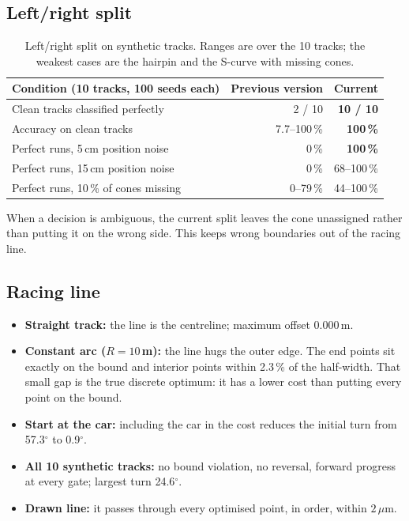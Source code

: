 \documentclass[10pt,a4paper]{scrartcl}
\begin{document}
  \subsection{Left/right split}

  \begin{table}[htbp]
  \small
  \centering
  \begin{tabular}{@{}lrr@{}}
  \toprule
  \textbf{Condition (10 tracks, 100 seeds each)} & \textbf{Previous version} & \textbf{Current} \\
  \midrule
  Clean tracks classified perfectly & 2 / 10 & \textbf{10 / 10} \\
  Accuracy on clean tracks & 7.7--100\,\% & \textbf{100\,\%} \\
  Perfect runs, 5\,cm position noise & 0\,\% & \textbf{100\,\%} \\
  Perfect runs, 15\,cm position noise & 0\,\% & 68--100\,\% \\
  Perfect runs, 10\,\% of cones missing & 0--79\,\% & 44--100\,\% \\
  \bottomrule
  \end{tabular}
  \caption{Left/right split on synthetic tracks. Ranges are over the 10 tracks; the weakest
  cases are the hairpin and the S-curve with missing cones.}
  \label{tab:lr}
  \end{table}

  When a decision is ambiguous, the current split leaves the cone unassigned rather than
  putting it on the wrong side. This keeps wrong boundaries out of the racing line.

  \subsection{Racing line}

  \begin{itemize}
    \item \textbf{Straight track:} the line is the centreline; maximum offset 0.000\,m.
    \item \textbf{Constant arc ($R=10$\,m):} the line hugs the outer edge. The end points sit exactly
      on the bound and interior points within 2.3\,\% of the half-width. That small gap is the
      true discrete optimum: it has a lower cost than putting every point on the bound.
    \item \textbf{Start at the car:} including the car in the cost reduces the initial turn from
      57.3$^\circ$ to 0.9$^\circ$.
    \item \textbf{All 10 synthetic tracks:} no bound violation, no reversal, forward progress at
      every gate; largest turn 24.6$^\circ$.
    \item \textbf{Drawn line:} it passes through every optimised point, in order, within $2\,\mu$m.
  \end{itemize}
\end{document}
